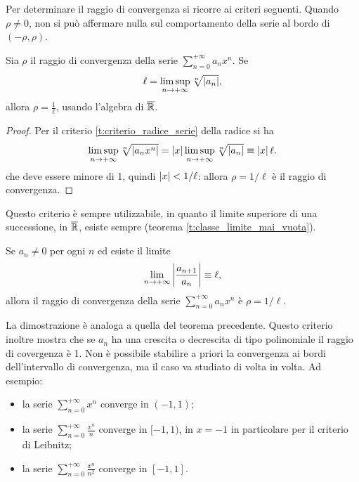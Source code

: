 Per determinare il raggio di convergenza si ricorre ai criteri seguenti.
Quando $\rho\neq 0$, non si può affermare nulla sul comportamento della serie al bordo di $(-\rho,\rho)$.
\begin{teorema}
Sia $\rho$ il raggio di convergenza della serie $\sum_{n=0}^{+\infty}a_nx^n$. Se
\[
\ell=\limsup_{n\to+\infty}\sqrt[n]{\left|{a_n}\right|},
\]
allora $\rho=\frac1{\ell}$, usando l'algebra di $\overline{\mathbb{R}}$.
\end{teorema}
\begin{proof}
Per il criterio \ref{t:criterio_radice_serie} della radice si ha
\[
\limsup_{n\to+\infty}\sqrt[n]{\left|{a_nx^n}\right|}=\left|{x}\right|\limsup_{n\to+\infty}\sqrt[n]{\left|{a_n}\right|}\equiv \left|{x}\right|\ell.
\]
che deve essere minore di 1, quindi $\left|{x}\right|<1/\ell$: allora $\rho=1/\ell$ è il raggio di convergenza.
\end{proof}
Questo criterio è sempre utilizzabile, in quanto il limite superiore di una successione, in $\overline{\mathbb{R}}$, esiste sempre (teorema \ref{t:classe_limite_mai_vuota}).
\begin{teorema}
Se $a_n\neq 0$ per ogni $n$ ed esiste il limite
\[
\lim_{n\to+\infty}\left|{\frac{a_{n+1}}{a_n}}\right|\equiv\ell,
\]
allora il raggio di convergenza della serie $\sum_{n=0}^{+\infty}a_nx^n$ è $\rho=1/\ell$.
\end{teorema}
La dimostrazione è analoga a quella del teorema precedente. Questo criterio inoltre mostra che se $a_n$ ha una crescita o decrescita di tipo polinomiale il raggio di covergenza è 1.
Non è possibile stabilire a priori la convergenza ai bordi dell'intervallo di convergenza, ma il caso va studiato di volta in volta. Ad esempio:
\begin{itemize}
\item la serie $\sum_{n=0}^{+\infty}x^n$ converge in $(-1,1)$;
\item la serie $\sum_{n=0}^{+\infty}\frac{x^n}{n}$ converge in $[-1,1)$, in $x=-1$ in particolare per il criterio di Leibnitz;
\item la serie $\sum_{n=0}^{+\infty}\frac{x^n}{n^2}$ converge in $[-1,1]$.
\end{itemize}

